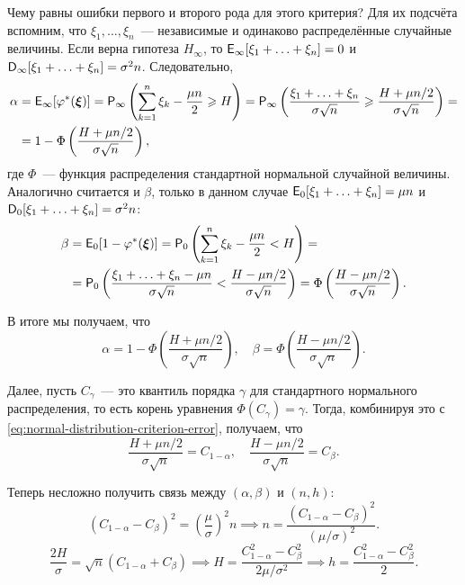 \begin{example}
	Чему равны ошибки первого и второго рода для этого критерия? Для их 
	подсчёта вспомним, что \(\xi_{1}, \ldots, \xi_{n}\)~--- независимые и 
	одинаково распределённые случайные величины. Если верна гипотеза 
	\(H_{\infty}\), то \(\E_{\infty}[\xi_{1} + \ldots + \xi_{n}] = 0\) и 
	\(\D_{\infty}[\xi_{1} + \ldots + \xi_{n}] = \sigma^{2}n\). Следовательно,
	\begin{align*}
		\alpha &= \E_{\infty}[\phi^{*}(\bm{\xi})] = \Pr_{\infty}\left(\sum_{k = 
			1}^{n} \xi_{k} - \frac{\mu n}{2} \geq H\right) = 
		\Pr_{\infty}\left(\frac{\xi_{1} + \ldots + \xi_{n}}{\sigma\sqrt{n}} 
		\geq \frac{H + \mu n/2}{\sigma\sqrt{n}}\right) = \\
		&= 1 - \Phi\left(\frac{H + \mu n/2}{\sigma\sqrt{n}}\right),
	\end{align*}
	где \(\Phi\)~--- функция распределения стандартной нормальной случайной 
	величины. Аналогично считается и \(\beta\), только в данном случае 
	\(\E_{0}[\xi_{1} + \ldots + \xi_{n}] = \mu n\) и 
	\(\D_{0}[\xi_{1} + \ldots + \xi_{n}] = \sigma^{2}n\):
	\begin{align*}
		\beta &= \E_{0}[1 - \phi^{*}(\bm{\xi})] = \Pr_{0}\left(\sum_{k = 
		1}^{n} \xi_{k} - \frac{\mu n}{2} < H\right) = \\
		&= \Pr_{0}\left(\frac{\xi_{1} + \ldots + \xi_{n} - \mu n} 
		{\sigma\sqrt{n}} < \frac{H - \mu n/2}{\sigma\sqrt{n}}\right) = 
		\Phi\left(\frac{H - \mu n/2}{\sigma\sqrt{n}}\right).
	\end{align*}
	
	В итоге мы получаем, что
	\begin{equation}\label{eq:normal-distribution-criterion-error}
		\alpha = 1 - \Phi\left(\frac{H + \mu n/2}{\sigma\sqrt{n}}\right),
		\quad
		\beta = \Phi\left(\frac{H - \mu n/2}{\sigma\sqrt{n}}\right).
	\end{equation}
	
	Далее, пусть \(C_{\gamma}\)~--- это квантиль порядка \(\gamma\) для 
	стандартного нормального распределения, то есть корень уравнения 
	\(\Phi(C_{\gamma}) = \gamma\). Тогда, комбинируя это с 
	\eqref{eq:normal-distribution-criterion-error}, получаем, что
	\begin{equation}
		\frac{H + \mu n/2}{\sigma\sqrt{n}} = C_{1 - \alpha}, 
		\quad
		\frac{H - \mu n/2}{\sigma\sqrt{n}} = C_{\beta}.
	\end{equation}
	
	Теперь несложно получить связь между \((\alpha, \beta)\) и \((n, h)\):
	\begin{equation}\label{eq:neyman-pearson-normal-n}
		(C_{1 - \alpha} - C_{\beta})^{2} = \left(\frac{\mu}{\sigma}\right)^{2}n 
		\implies n = \frac{(C_{1 - \alpha} - C_{\beta})^{2}}{(\mu/\sigma)^{2}}.
	\end{equation}
	\begin{equation}\label{eq:neyman-pearson-normal-H}
		\frac{2H}{\sigma} = \sqrt{n}(C_{1 - \alpha} + C_{\beta}) \implies H = 
		\frac{C_{1 - \alpha}^{2} - C_{\beta}^{2}}{2\mu/\sigma^{2}} \implies 
		h = \frac{C_{1 - \alpha}^{2} - C_{\beta}^{2}}{2}.
	\end{equation}
	

\end{example}
